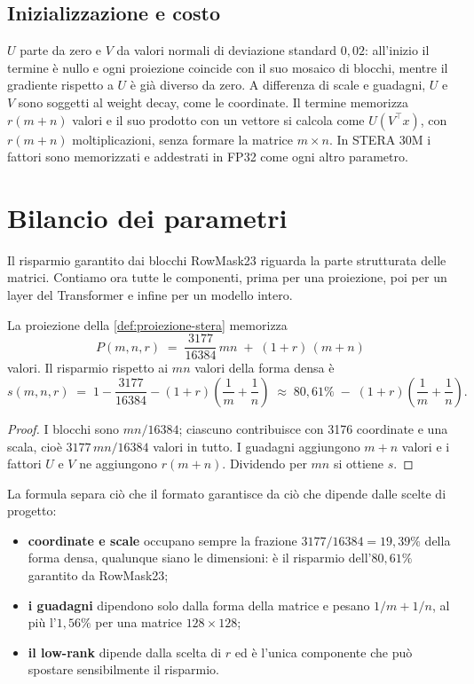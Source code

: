 \subsection{Inizializzazione e costo}
$U$ parte da zero e $V$ da valori normali di deviazione standard $0{,}02$: all'inizio il termine è nullo e ogni proiezione coincide con il suo mosaico di blocchi, mentre il gradiente rispetto a $U$ è già diverso da zero. A differenza di scale e guadagni, $U$ e $V$ sono soggetti al weight decay, come le coordinate. Il termine memorizza $r(m+n)$ valori e il suo prodotto con un vettore si calcola come $U(V^\top x)$, con $r(m+n)$ moltiplicazioni, senza formare la matrice $m\times n$. In STERA 30M i fattori sono memorizzati e addestrati in FP32 come ogni altro parametro.


\section{Bilancio dei parametri}
\label{sec:bilancio-parametri}

Il risparmio garantito dai blocchi RowMask23 riguarda la parte strutturata delle matrici. Contiamo ora tutte le componenti, prima per una proiezione, poi per un layer del Transformer e infine per un modello intero.

\begin{proposizione}
\label{prop:risparmio-proiezione}
La proiezione della \autoref{def:proiezione-stera} memorizza
\[
P(m,n,r) \;=\; \frac{3177}{16384}\,mn \;+\; (1+r)\,(m+n)
\]
valori. Il risparmio rispetto ai $mn$ valori della forma densa è
\[
s(m,n,r) \;=\; 1-\frac{3177}{16384}-(1+r)\left(\frac1m+\frac1n\right)
\;\approx\; 80{,}61\% \;-\; (1+r)\left(\frac1m+\frac1n\right).
\]
\end{proposizione}

\begin{proof}
I blocchi sono $mn/16384$; ciascuno contribuisce con 3176 coordinate e una scala, cioè $3177\,mn/16384$ valori in tutto. I guadagni aggiungono $m+n$ valori e i fattori $U$ e $V$ ne aggiungono $r(m+n)$. Dividendo per $mn$ si ottiene $s$.
\end{proof}

La formula separa ciò che il formato garantisce da ciò che dipende dalle scelte di progetto:
\begin{itemize}
\item \textbf{coordinate e scale} occupano sempre la frazione $3177/16384=19{,}39\%$ della forma densa, qualunque siano le dimensioni: è il risparmio dell'$80{,}61\%$ garantito da RowMask23;
\item \textbf{i guadagni} dipendono solo dalla forma della matrice e pesano $1/m+1/n$, al più l'$1{,}56\%$ per una matrice $128\times128$;
\item \textbf{il low-rank} dipende dalla scelta di $r$ ed è l'unica componente che può spostare sensibilmente il risparmio.
\end{itemize}

